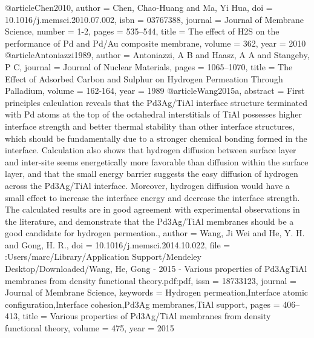 @article{Chen2010,
author = {Chen, Chao-Huang and Ma, Yi Hua},
doi = {10.1016/j.memsci.2010.07.002},
isbn = {03767388},
journal = {Journal of Membrane Science},
number = {1-2},
pages = {535--544},
title = {{The effect of H2S on the performance of Pd and Pd/Au composite membrane}},
volume = {362},
year = {2010}
}
@article{Antoniazzi1989,
author = {Antoniazzi, A B and Haasz, A A and Stangeby, P C},
journal = {Journal of Nuclear Materials},
pages = {1065--1070},
title = {{The Effect of Adsorbed Carbon and Sulphur on Hydrogen Permeation Through Palladium}},
volume = {162-164},
year = {1989}
}
@article{Wang2015a,
abstract = {First principles calculation reveals that the Pd3Ag/TiAl interface structure terminated with Pd atoms at the top of the octahedral interstitials of TiAl possesses higher interface strength and better thermal stability than other interface structures, which should be fundamentally due to a stronger chemical bonding formed in the interface. Calculation also shows that hydrogen diffusion between surface layer and inter-site seems energetically more favorable than diffusion within the surface layer, and that the small energy barrier suggests the easy diffusion of hydrogen across the Pd3Ag/TiAl interface. Moreover, hydrogen diffusion would have a small effect to increase the interface energy and decrease the interface strength. The calculated results are in good agreement with experimental observations in the literature, and demonstrate that the Pd3Ag/TiAl membranes should be a good candidate for hydrogen permeation.},
author = {Wang, Ji Wei and He, Y. H. and Gong, H. R.},
doi = {10.1016/j.memsci.2014.10.022},
file = {:Users/marc/Library/Application Support/Mendeley Desktop/Downloaded/Wang, He, Gong - 2015 - Various properties of Pd3AgTiAl membranes from density functional theory.pdf:pdf},
issn = {18733123},
journal = {Journal of Membrane Science},
keywords = {Hydrogen permeation,Interface atomic configuration,Interface cohesion,Pd3Ag membranes,TiAl support},
pages = {406--413},
title = {{Various properties of Pd3Ag/TiAl membranes from density functional theory}},
volume = {475},
year = {2015}
}
